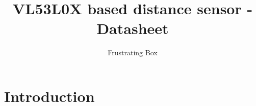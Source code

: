 \documentclass[12pt,a4paper]{article}
\author{Frustrating Box}
\title{VL53L0X based distance sensor - Datasheet}
\begin{document}
\maketitle

\section{Introduction}
	
\end{document}
